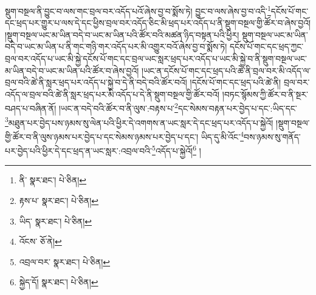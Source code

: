 སྡུག་བསྔལ་ནི་བྱུང་བ་ལས་གང་བྲལ་བར་འདོད་པའོ་ཞེས་བྱ་བ་སྨོས་ཏེ། བྱུང་བ་ལས་ཞེས་བྱ་བ་འདི་\footnote{ནི་  སྣར་ཐང་།  པེ་ཅིན། }དངོས་པོ་གང་དང་ཕྲད་པར་གྱུར་པ་ལས་དེ་དང་ཕྱིས་བྲལ་བར་འདོད་ཅིང་མི་ཕྲད་པར་འདོད་པ་ནི་སྡུག་བསྔལ་གྱི་ཚོར་བ་ཞེས་བྱའོ། །སྡུག་བསྔལ་ཡང་མ་ཡིན་བདེ་བ་ཡང་མ་ཡིན་པའི་ཚོར་བའི་མཚན་ཉིད་བསྟན་པའི་ཕྱིར། སྡུག་བསྔལ་ཡང་མ་ཡིན་བདེ་བ་ཡང་མ་ཡིན་པ་ནི་གང་གཉི་གར་འདོད་པར་མི་འགྱུར་བའོ་ཞེས་བྱ་བ་སྨོས་ཏེ། དངོས་པོ་གང་དང་ཕྲད་ཀྱང་བྲལ་བར་འདོད་པ་ཡང་མི་སྐྱེ་དངོས་པོ་གང་དང་བྲལ་ཡང་སླར་ཕྲད་པར་འདོད་པ་ཡང་མི་སྐྱེ་བ་ནི་སྡུག་བསྔལ་ཡང་མ་ཡིན་བདེ་བ་ཡང་མ་ཡིན་པའི་ཚོར་བ་ཞེས་བྱའོ། །ཡང་ན་དངོས་པོ་གང་དང་ཕྲད་པའི་ཚེ་ནི་བྲལ་བར་མི་འདོད་ལ་བྲལ་བའི་ཚེ་ནི་སླར་ཕྲད་པར་འདོད་པ་སྐྱེ་བ་དེ་ནི་བདེ་བའི་ཚོར་བའོ། །དངོས་པོ་གང་དང་ཕྲད་པའི་ཚེ་ནི། བྲལ་བར་འདོད་ལ་བྲལ་བའི་ཚེ་ནི་སླར་ཕྲད་པར་མི་འདོད་པ་དེ་ནི་སྡུག་བསྔལ་གྱི་ཚོར་བའོ། །བཏང་སྙོམས་ཀྱི་ཚོར་བ་ནི་སྔར་བཤད་པ་བཞིན་ནོ། །ཡང་ན་བདེ་བའི་ཚོར་བ་ནི་ལུས་:བརྟས་པ་\footnote{རྟས་པ་  སྣར་ཐང་།  པེ་ཅིན། }དང་སེམས་བརྟན་པར་བྱེད་པ་དང་:ཡིད་དང་\footnote{ཡིད་  སྣར་ཐང་།  པེ་ཅིན། }མཐུན་པར་བྱེད་པས་ཉམས་སུ་ལེན་པའི་ཕྱིར་དེ་འགགས་ན་ཡང་སླར་དེ་དང་ཕྲད་པར་འདོད་པ་སྐྱེའོ། །སྡུག་བསྔལ་གྱི་ཚོར་བ་ནི་ལུས་ཉམས་པར་བྱེད་པ་དང་སེམས་ཉམས་པར་བྱེད་པ་དང་། ཡིད་དུ་མི་འོང་\footnote{འོངས་  ཅོ་ནེ། }བས་ཉམས་སུ་གནོད་པར་བྱེད་པའི་ཕྱིར་དེ་དང་ཕྲད་ན་ཡང་སླར་:འབྲལ་བའི་\footnote{འབྲལ་བར་  སྣར་ཐང་།  པེ་ཅིན། }འདོད་པ་སྐྱེའོ།\footnote{སྐྱེད་དོ།  སྣར་ཐང་།  པེ་ཅིན། } །
